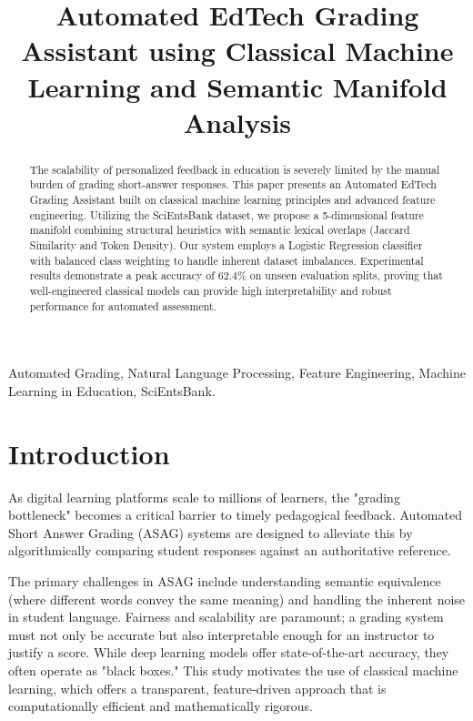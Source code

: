\documentclass[conference]{IEEEtran}
\begin{document}
\title{Automated EdTech Grading Assistant using Classical Machine Learning and Semantic Manifold Analysis}

\author{
}

\maketitle

\begin{abstract}
The scalability of personalized feedback in education is severely limited by the manual burden of grading short-answer responses. This paper presents an Automated EdTech Grading Assistant built on classical machine learning principles and advanced feature engineering. Utilizing the SciEntsBank dataset, we propose a 5-dimensional feature manifold combining structural heuristics with semantic lexical overlaps (Jaccard Similarity and Token Density). Our system employs a Logistic Regression classifier with balanced class weighting to handle inherent dataset imbalances. Experimental results demonstrate a peak accuracy of 62.4\% on unseen evaluation splits, proving that well-engineered classical models can provide high interpretability and robust performance for automated assessment.
\end{abstract}

\begin{IEEEkeywords}
Automated Grading, Natural Language Processing, Feature Engineering, Machine Learning in Education, SciEntsBank.
\end{IEEEkeywords}

\section{Introduction}
As digital learning platforms scale to millions of learners, the "grading bottleneck" becomes a critical barrier to timely pedagogical feedback. Automated Short Answer Grading (ASAG) systems are designed to alleviate this by algorithmically comparing student responses against an authoritative reference.

The primary challenges in ASAG include understanding semantic equivalence (where different words convey the same meaning) and handling the inherent noise in student language. Fairness and scalability are paramount; a grading system must not only be accurate but also interpretable enough for an instructor to justify a score. While deep learning models offer state-of-the-art accuracy, they often operate as "black boxes." This study motivates the use of classical machine learning, which offers a transparent, feature-driven approach that is computationally efficient and mathematically rigorous.
\end{document}
